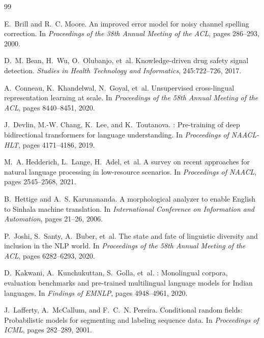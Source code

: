 \documentclass[12pt, a4paper, twoside]{report}
\begin{document}
\begin{thebibliography}{99}

E.~Brill and R.~C. Moore.
\newblock An improved error model for noisy channel spelling correction.
\newblock In \emph{Proceedings of the 38th Annual Meeting of the ACL}, pages 286--293, 2000.

D.~M. Bean, H.~Wu, O.~Olubanjo, et~al.
\newblock Knowledge-driven drug safety signal detection.
\newblock \emph{Studies in Health Technology and Informatics}, 245:722--726, 2017.

A.~Conneau, K.~Khandelwal, N.~Goyal, et~al.
\newblock Unsupervised cross-lingual representation learning at scale.
\newblock In \emph{Proceedings of the 58th Annual Meeting of the ACL}, pages 8440--8451, 2020.

J.~Devlin, M.-W. Chang, K.~Lee, and K.~Toutanova.
: Pre-training of deep bidirectional transformers for language understanding.
\newblock In \emph{Proceedings of NAACL-HLT}, pages 4171--4186, 2019.

M.~A. Hedderich, L.~Lange, H.~Adel, et~al.
\newblock A survey on recent approaches for natural language processing in low-resource scenarios.
\newblock In \emph{Proceedings of NAACL}, pages 2545--2568, 2021.

B.~Hettige and A.~S. Karunananda.
\newblock A morphological analyzer to enable {English} to {Sinhala} machine translation.
\newblock In \emph{International Conference on Information and Automation}, pages 21--26, 2006.

P.~Joshi, S.~Santy, A.~Buber, et~al.
\newblock The state and fate of linguistic diversity and inclusion in the {NLP} world.
\newblock In \emph{Proceedings of the 58th Annual Meeting of the ACL}, pages 6282--6293, 2020.

D.~Kakwani, A.~Kunchukuttan, S.~Golla, et~al.
: Monolingual corpora, evaluation benchmarks and pre-trained multilingual language models for {Indian} languages.
\newblock In \emph{Findings of EMNLP}, pages 4948--4961, 2020.

J.~Lafferty, A.~McCallum, and F.~C.~N. Pereira.
\newblock Conditional random fields: Probabilistic models for segmenting and labeling sequence data.
\newblock In \emph{Proceedings of ICML}, pages 282--289, 2001.


\end{thebibliography}
\end{document}
